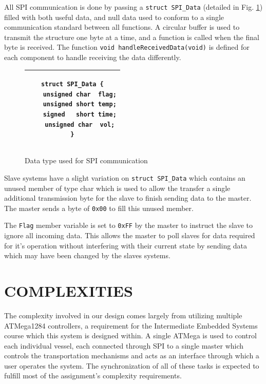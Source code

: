 \documentclass[letterpaper, 10 pt, conference]{ieeeconf}  %
\begin{document}
All SPI communication is done by passing a \texttt{struct SPI\_Data} (detailed in Fig. \ref{spi:struct}) filled with both useful data, and null data used to conform to a single communication standard between all functions. A circular buffer is used to transmit the structure one byte at a time, and a function is called when the final byte is received. The function \texttt{void handleReceivedData(void)} is defined for each component to handle receiving the data differently.

\begin{figure}[thpb]
\begin{center}
\begin{tabular}{|c|}
\hline
\begin{lstlisting}
struct SPI_Data {
    unsigned char  flag;
    unsigned short temp;
    signed   short time;
    unsigned char  vol;
}
\end{lstlisting} \\
\hline
\end{tabular}
\end{center}
\caption{Data type used for SPI communication}
\label{spi:struct}
\end{figure}

Slave systems have a slight variation on \texttt{struct SPI\_Data} which contains an unused member of type char which is used to allow the transfer a single additional transmission byte for the slave to finish sending data to the master. The master sends a byte of \texttt{0x00} to fill this unused member.

The \texttt{Flag} member variable is set to \texttt{0xFF} by the master to instruct the slave to ignore all incoming data. This allows the master to poll slaves for data required for it's operation without interfering with their current state by sending data which may have been changed by the slaves systems.

\section{COMPLEXITIES}

The complexity involved in our design comes largely from utilizing multiple ATMega1284 controllers, a requirement for the Intermediate Embedded Systems course which this system is designed within. A single ATMega is used to control each individual vessel, each connected through SPI to a single master which controls the transportation mechanisms and acts as an interface through which a user operates the system. The synchronization of all of these tasks is expected to fulfill most of the assignment's complexity requirements.
\end{document}
